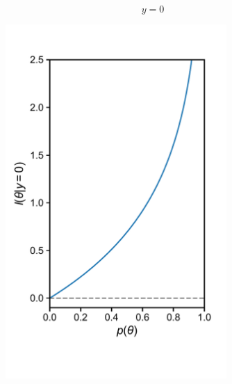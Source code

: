 \documentclass[10pt,aspectratio=169]{beamer}
\begin{document}
\begin{frame}
\begin{columns}[T]
          \begin{column}{0.5\textwidth}
            \begin{equation*}
            y = 0
          \end{equation*}
          \vspace{-4em}
            \begin{figure}[t]
              \includegraphics[width=0.75\textwidth]{scripts/loss_2.pdf}
            \end{figure}
          \end{column}
          
        \end{columns}
      \end{frame}
\end{document}
